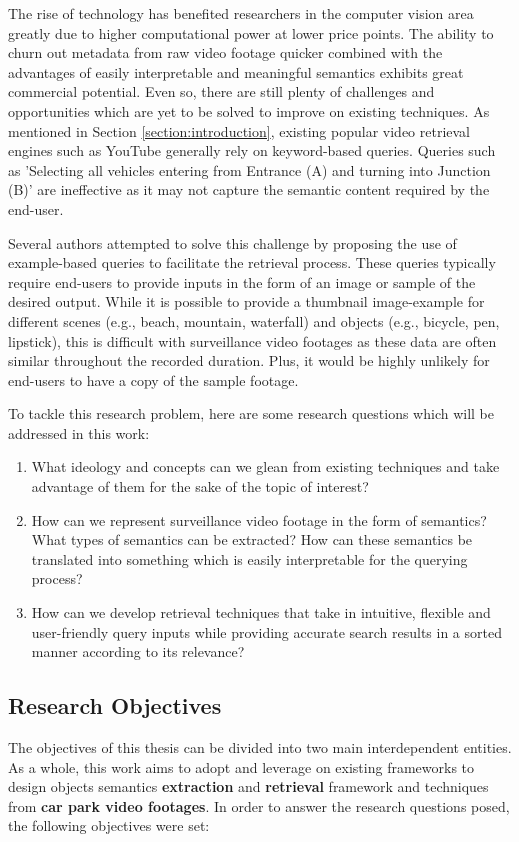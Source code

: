 The rise of technology has benefited researchers in the computer vision area greatly due to higher computational power at lower price points. The ability to churn out metadata from raw video footage quicker combined with the advantages of easily interpretable and meaningful semantics exhibits great commercial potential. Even so, there are still plenty of challenges and opportunities which are yet to be solved to improve on existing techniques. As mentioned in Section \ref{section:introduction}, existing popular video retrieval engines such as YouTube generally rely on keyword-based queries. Queries such as 'Selecting all vehicles entering from Entrance (A) and turning into Junction (B)' are ineffective as it may not capture the semantic content required by the end-user.

Several authors attempted to solve this challenge by proposing the use of example-based queries \cite{zhang2017car, liu2016large, castanon2016retrieval} to facilitate the retrieval process.
These queries typically require end-users to provide inputs in the form of an image or sample of the desired output. While it is possible to provide a thumbnail image-example for different scenes (e.g., beach, mountain, waterfall) and objects (e.g., bicycle, pen, lipstick), this is difficult with surveillance video footages as these data are often similar throughout the recorded duration. Plus, it would be highly unlikely for end-users to have a copy of the sample footage.

To tackle this research problem, here are some research questions which will be addressed in this work:
\begin{enumerate}
\item What ideology and concepts can we glean from existing techniques and take advantage of them for the sake of the topic of interest?
\item How can we represent surveillance video footage in the form of semantics? What types of semantics can be extracted? How can these semantics be translated into something which is easily interpretable for the querying process?
\item How can we develop retrieval techniques that take in intuitive, flexible and user-friendly query inputs while providing accurate search results in a sorted manner according to its relevance?
\end{enumerate}



\subsection{Research Objectives}
The objectives of this thesis can be divided into two main interdependent entities. As a whole, this work aims to adopt and leverage on existing frameworks to design objects semantics \textbf{extraction} and \textbf{retrieval} framework and techniques from \textbf{car park video footages}. In order to answer the research questions posed, the following objectives were set:

